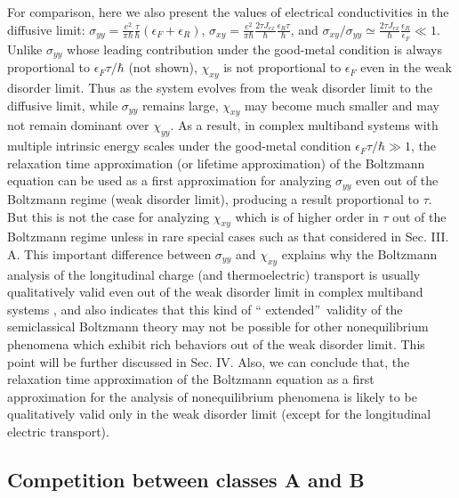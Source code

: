 \documentclass
[aps,pra,amsfonts,amssymb,twocolumn,amsmath,preprintnumbers,nofootinbib,floatfix,
showpacs,superscriptaddress]{revtex4-1}%
\begin{document}
For comparison, here we also present the values of electrical conductivities
in the diffusive limit: $\sigma_{yy}=\frac{e^{2}}{\pi\hbar}\frac{\tau}{\hbar
}\left(  \epsilon_{F}+\epsilon_{R}\right)  $, $\sigma_{xy}=\frac{e^{2}}%
{\pi\hbar}\frac{2\tau J_{ex}}{\hbar}\frac{\epsilon_{R}\tau}{\hbar}$, and
$\sigma_{xy}/\sigma_{yy}\simeq\frac{2\tau J_{ex}}{\hbar}\frac{\epsilon_{R}%
}{\epsilon_{F}}\ll1$. Unlike $\sigma_{yy}$ whose leading contribution under
the good-metal condition is always proportional to $\epsilon_{F}\tau/\hbar$
(not shown), $\chi_{xy}$ is not proportional to $\epsilon_{F}$ even in the
weak disorder limit. Thus as the system evolves from the weak disorder limit
to the diffusive limit, while $\sigma_{yy}$ remains large, $\chi_{xy}$ may
become much smaller and may not remain dominant over $\chi_{yy}$. As a result,
in complex multiband systems with multiple intrinsic energy scales under the
good-metal condition $\epsilon_{F}\tau/\hbar\gg1$, the relaxation time
approximation (or lifetime approximation) of the Boltzmann equation can be
used as a first approximation for analyzing $\sigma_{yy}$ even out of the
Boltzmann regime (weak disorder limit), producing a result proportional to
$\tau$. But this is not the case for analyzing $\chi_{xy}$ which is of higher
order in $\tau$ out of the Boltzmann regime unless in rare special cases such
as that considered in Sec. III. A. This important difference between
$\sigma_{yy}$ and $\chi_{xy}$ explains why the Boltzmann analysis of the
longitudinal charge (and thermoelectric) transport is usually qualitatively
valid even out of the weak disorder limit in complex multiband systems
\cite{Ziman}, and also indicates that this kind of \textquotedblleft
extended\textquotedblright\ validity of the semiclassical Boltzmann theory may
not be possible for other nonequilibrium phenomena which exhibit rich
behaviors out of the weak disorder limit. This point will be further discussed
in Sec. IV. Also, we can conclude that, the relaxation time approximation of 
the Boltzmann equation as a first approximation for the analysis of 
nonequilibrium phenomena is likely to be qualitatively valid only in the 
weak disorder limit (except for the longitudinal electric transport).

\subsection{Competition between classes A and B}
\end{document}
